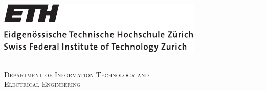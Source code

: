 \makeatletter
{}
\begin{titlepage}

 \thispagestyle{empty}

 \begin{center}
  \begin{minipage}[b]{0.45\linewidth}
   \vspace{0pt}	
   \includegraphics[width=0.8\linewidth]{./figures/eth_logo}
  \end{minipage}\hfill
  \begin{minipage}{0.45\textwidth}
   \vspace{-0.55cm}
  \end{minipage}

  \vspace{0.1cm}

  \hspace*{0.15cm}\rule{0.985\textwidth}{0.4pt}

  \vspace{0.5cm}

  {\Large\textsc{Department of Information Technology and \\Electrical Engineering}}


\end{center}
\end{titlepage}
